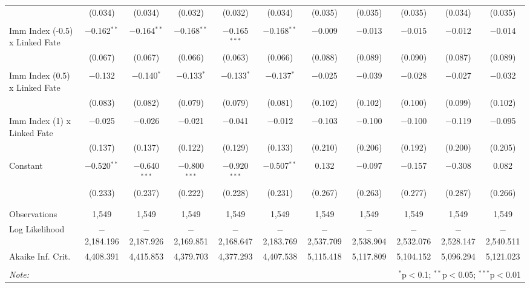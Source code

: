 \begin{table}[!htbp]
\begin{tabular}{@{\extracolsep{5pt}}lcccccccccc}
  & (0.034) & (0.034) & (0.032) & (0.032) & (0.034) & (0.035) & (0.035) & (0.035) & (0.034) & (0.035) \\ 
  & & & & & & & & & & \\ 
 Imm Index (-0.5) x Linked Fate & $-$0.162$^{**}$ & $-$0.164$^{**}$ & $-$0.168$^{**}$ & $-$0.165$^{***}$ & $-$0.168$^{**}$ & $-$0.009 & $-$0.013 & $-$0.015 & $-$0.012 & $-$0.014 \\ 
  & (0.067) & (0.067) & (0.066) & (0.063) & (0.066) & (0.088) & (0.089) & (0.090) & (0.087) & (0.089) \\ 
  & & & & & & & & & & \\ 
 Imm Index (0.5) x Linked Fate & $-$0.132 & $-$0.140$^{*}$ & $-$0.133$^{*}$ & $-$0.133$^{*}$ & $-$0.137$^{*}$ & $-$0.025 & $-$0.039 & $-$0.028 & $-$0.027 & $-$0.032 \\ 
  & (0.083) & (0.082) & (0.079) & (0.079) & (0.081) & (0.102) & (0.102) & (0.100) & (0.099) & (0.102) \\ 
  & & & & & & & & & & \\ 
 Imm Index (1) x Linked Fate & $-$0.025 & $-$0.026 & $-$0.021 & $-$0.041 & $-$0.012 & $-$0.103 & $-$0.100 & $-$0.100 & $-$0.119 & $-$0.095 \\ 
  & (0.137) & (0.137) & (0.122) & (0.129) & (0.133) & (0.210) & (0.206) & (0.192) & (0.200) & (0.205) \\ 
  & & & & & & & & & & \\ 
 Constant & $-$0.520$^{**}$ & $-$0.640$^{***}$ & $-$0.800$^{***}$ & $-$0.920$^{***}$ & $-$0.507$^{**}$ & 0.132 & $-$0.097 & $-$0.157 & $-$0.308 & 0.082 \\ 
  & (0.233) & (0.237) & (0.222) & (0.228) & (0.231) & (0.267) & (0.263) & (0.277) & (0.287) & (0.266) \\ 
  & & & & & & & & & & \\ 
\hline \\[-1.8ex] 
Observations & 1,549 & 1,549 & 1,549 & 1,549 & 1,549 & 1,549 & 1,549 & 1,549 & 1,549 & 1,549 \\ 
Log Likelihood & $-$2,184.196 & $-$2,187.926 & $-$2,169.851 & $-$2,168.647 & $-$2,183.769 & $-$2,537.709 & $-$2,538.904 & $-$2,532.076 & $-$2,528.147 & $-$2,540.511 \\ 
Akaike Inf. Crit. & 4,408.391 & 4,415.853 & 4,379.703 & 4,377.293 & 4,407.538 & 5,115.418 & 5,117.809 & 5,104.152 & 5,096.294 & 5,121.023 \\ 
\hline 
\hline \\[-1.8ex] 
\textit{Note:}  & \multicolumn{10}{r}{$^{*}$p$<$0.1; $^{**}$p$<$0.05; $^{***}$p$<$0.01} \\ 
\end{tabular} 
\end{table} 
